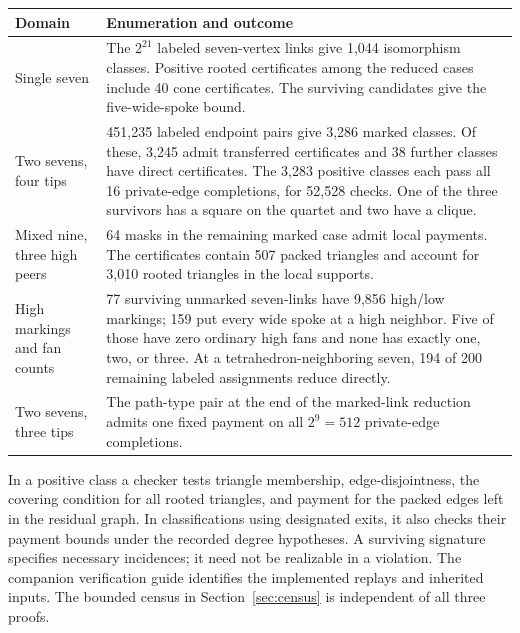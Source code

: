 \documentclass[11pt,a4paper]{amsart}
\begin{document}
\begin{center}\small
\begin{tabular}{@{}p{.24\linewidth}p{.69\linewidth}@{}}
\hline
Domain & Enumeration and outcome\\ \hline
Single seven &
The $2^{21}$ labeled seven-vertex links give 1,044 isomorphism
classes. Positive rooted certificates among the reduced cases
include 40 cone certificates. The surviving candidates give the
five-wide-spoke bound.\\[3pt]
Two sevens, four tips &
451,235 labeled endpoint pairs give 3,286 marked classes.
Of these, 3,245 admit transferred certificates and 38 further
classes have direct certificates. The 3,283 positive classes each
pass all 16 private-edge completions, for 52,528 checks. One of the
three survivors has a square on the quartet and two have a clique.\\[3pt]
Mixed nine, three high peers &
64 masks in the remaining marked case admit local payments.
The certificates contain 507 packed triangles and account for
3,010 rooted triangles in the local supports.\\[3pt]
High markings and fan counts &
77 surviving unmarked seven-links have 9,856 high/low markings;
159 put every wide spoke at a high neighbor. Five of those have
zero ordinary high fans and none has exactly one, two, or three.
At a tetrahedron-neighboring seven, 194 of 200 remaining labeled
assignments reduce directly.\\[3pt]
Two sevens, three tips &
The path-type pair at the end of the marked-link reduction admits
one fixed payment on all $2^9=512$ private-edge completions.\\ \hline
\end{tabular}
\end{center}
In a positive class a checker tests triangle membership,
edge-disjointness, the covering condition for all rooted
triangles, and payment for the packed edges left in the residual
graph. In classifications using designated exits, it also checks
their payment bounds under the recorded degree hypotheses. A
surviving signature specifies necessary incidences; it need not
be realizable in a violation. The companion verification guide
identifies the implemented replays and inherited inputs. The
bounded census in Section~\ref{sec:census} is independent of all
three proofs.
\end{document}
